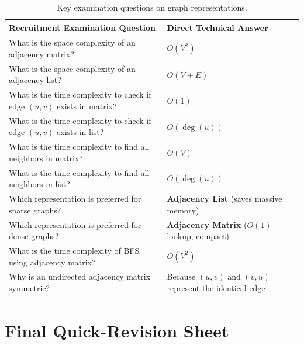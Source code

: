 \begin{table}[htbp]
\centering
\small
\begin{tabularx}{\textwidth}{p{8cm} X}
\toprule
\textbf{Recruitment Examination Question} & \textbf{Direct Technical Answer} \\
\midrule
What is the space complexity of an adjacency matrix? & $O(V^2)$ \\
What is the space complexity of an adjacency list? & $O(V + E)$ \\
What is the time complexity to check if edge $(u,v)$ exists in matrix? & $O(1)$ \\
What is the time complexity to check if edge $(u,v)$ exists in list? & $O(\deg(u))$ \\
What is the time complexity to find all neighbors in matrix? & $O(V)$ \\
What is the time complexity to find all neighbors in list? & $O(\deg(u))$ \\
Which representation is preferred for sparse graphs? & \textbf{Adjacency List} (saves massive memory) \\
Which representation is preferred for dense graphs? & \textbf{Adjacency Matrix} ($O(1)$ lookup, compact) \\
What is the time complexity of BFS using adjacency matrix? & $O(V^2)$ \\
Why is an undirected adjacency matrix symmetric? & Because $(u, v)$ and $(v, u)$ represent the identical edge \\
\bottomrule
\end{tabularx}
\caption{Key examination questions on graph representations.}
\end{table}

\section{Final Quick-Revision Sheet}

